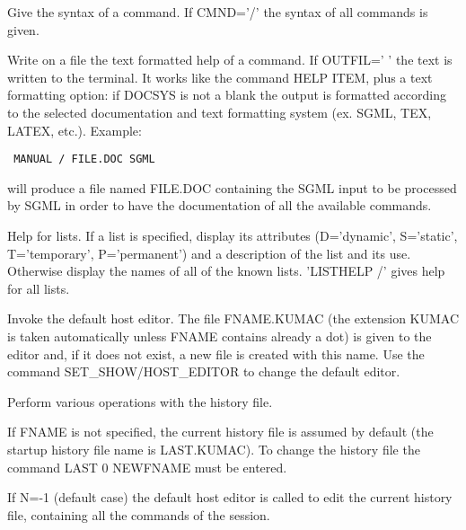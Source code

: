 \BEGARG
{}
\ENDARG
\BEGTEXT
Give the syntax of a command.
If CMND='/' the syntax of all commands is given.
\ENDTEXT

\BEGARG
{}
\ENDARG
\BEGTEXT
Write on a file the text formatted help of a command.
If OUTFIL=' ' the text is written to the terminal.
It works like the command HELP ITEM, plus a text formatting option:
if DOCSYS is not a blank the output is formatted according to the selected
documentation and text formatting system (ex. SGML, TEX, LATEX, etc.).
Example:
\begin{verbatim}
 MANUAL / FILE.DOC SGML
\end{verbatim}
will produce a file named FILE.DOC
containing the SGML input to be processed
by SGML in order to have the documentation of all the available commands.
\ENDTEXT

\BEGARG
{}
\ENDARG
\BEGTEXT
Help for lists.
If a list is specified, display its attributes (D='dynamic', S='static',
T='temporary', P='permanent') and a description of the list and its use.
Otherwise display the names of all of the known lists.
'LISTHELP /' gives help for all lists.
\ENDTEXT

\BEGARG
{}
\ENDARG
\BEGTEXT
Invoke the default host editor.
The file FNAME.KUMAC (the extension KUMAC is taken automatically
unless FNAME contains already a dot) is given to the editor and,
if it does not exist, a new file is created with this name.
Use the command SET\_SHOW/HOST\_EDITOR to change the default editor.
\ENDTEXT

\BEGARG
{}
\ENDARG
\BEGTEXT
Perform various operations with the history file.

If FNAME is not specified, the current history file is assumed by default
(the startup history file name is LAST.KUMAC).
To change the history file the command LAST 0 NEWFNAME must be entered.

If N=-1 (default case) the default host editor is called
to edit the current history file, containing all the commands of the session.

